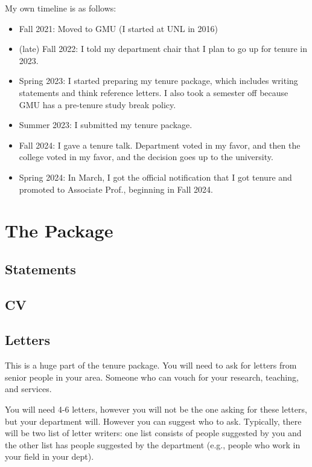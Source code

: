 \documentclass[oneside,11pt,dvipsnames]{book}
\begin{document}
My own timeline is as follows:

\begin{itemize}
    \item Fall 2021: Moved to GMU (I started at UNL in 2016)
    \item (late) Fall 2022: I told my department chair that I plan to go up for tenure in 2023.
    \item Spring 2023: I started preparing my tenure package, which includes writing statements and think reference letters.  I also took a semester off because GMU has a pre-tenure study break policy.
    \item Summer 2023: I submitted my tenure package.
    \item Fall 2024: I gave a tenure talk. Department voted in my favor, and then the college voted in my favor, and the decision goes up to the university.
    \item Spring 2024: In March, I got the official notification that I got tenure and promoted to Associate Prof., beginning in Fall 2024.
\end{itemize}

\section{The Package}



\subsection{Statements}

\subsection{CV}

\subsection{Letters}
This is a huge part of the tenure package. You will need to ask for letters from senior people in your area.  Someone who can vouch for your research, teaching, and services. 

You will need 4-6 letters, however you will not be the one asking for these letters, but your department will. However you can suggest who to ask. Typically, there will be two list of letter writers: one list consists of people suggested by you and the other list has people suggested by the department (e.g., people who work in your field in your dept).
\end{document}

